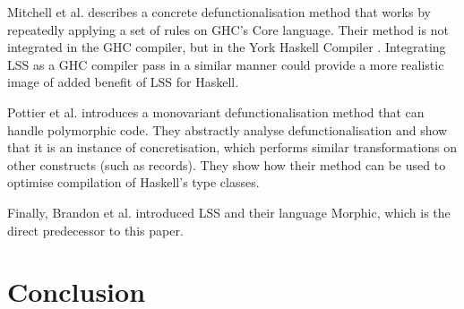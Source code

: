 \documentclass[a4paper,UKenglish,cleveref, autoref, thm-restate]{template/lipics-v2021}
\newcommand{\lss}{LSS\xspace}
\newcommand{\sml}{SML\xspace}
\begin{document}
Mitchell et al. \cite{mitchell2009losing} describes a concrete defunctionalisation method that works by repeatedly applying a set of rules on GHC's Core language. Their method is not integrated in the GHC compiler, but in the York Haskell Compiler \cite{golubovsky2007yhc}. Integrating LSS as a GHC compiler pass in a similar manner could provide a more realistic image of added benefit of LSS for Haskell.

Pottier et al. \cite{pottier2006polymorphic} introduces a monovariant defunctionalisation method that can handle polymorphic code. They abstractly analyse defunctionalisation and show that it is an instance of concretisation, which performs similar transformations on other constructs (such as records). They show how their method can be used to optimise compilation of Haskell's type classes.

Finally, Brandon et al. \cite{brandon2023better} introduced \lss and their language Morphic, which is the direct predecessor to this paper.




\section{Conclusion}



\end{document}
